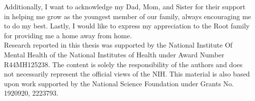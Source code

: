 \documentclass[
12pt, %
oneside, %
english, %
singlespacing, %
liststotoc, %
headsepline, %
chapterinoneline, %
]{MastersDoctoralThesis} %
\begin{document}
\begin{acknowledgements}
Additionally, I want to acknowledge my Dad, Mom, and Sister for their support in helping me grow as the youngest member of our family, always encouraging me to do my best. Lastly, I would like to express my appreciation to the Root family for providing me a home away from home.\\

Research reported in this thesis was supported by the National Institute Of Mental Health of the National Institutes of Health under Award Number R44MH125238. The content is solely the responsibility of the authors and does not necessarily represent the official views of the NIH. This material is also based upon work supported by the National Science Foundation under Grants No. 1920920, 2223793.

\end{acknowledgements}


%
%
%

{
  \hypersetup{linkcolor=black}
  \tableofcontents %
}

{
  \hypersetup{linkcolor=black}
  \listoffigures
}

{
  \hypersetup{linkcolor=black}
  \listoftables %
}


{
  \hypersetup{linkcolor=black}
  \listofalgorithms %
}

\end{document}
